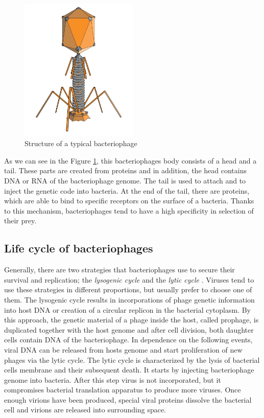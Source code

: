 \begin{figure}[h]
\includegraphics[width=0.5\textwidth]{./images/phage.png}
\centering
\caption{Structure of a typical bacteriophage
}
\label{fig:phage}
\end{figure}


As we can see in the Figure \ref{fig:phage}, this bacteriophages body consists of a head and a tail.
These parts are created from proteins and in addition, the head contains DNA or RNA of the bacteriophage genome.
The tail is used to attach and to inject the genetic code into bacteria.
At the end of the tail, there are proteins, which are able to bind to specific receptors on the surface of a bacteria.
Thanks to this mechanism, bacteriophages tend to have a high specificity in selection of their prey.

\subsection{Life cycle of bacteriophages}
Generally, there are two strategies that bacteriophages use to secure their survival and replication; the \emph{lysogenic cycle} and the \emph{lytic cycle} \cite{}.
Viruses tend to use these strategies in different proportions, but usually prefer to choose one of them.
The lysogenic cycle results in incorporations of phage genetic information into host DNA or creation of a circular replicon in the bacterial cytoplasm.
By this approach, the genetic material of a phage inside the host, called prophage, is duplicated together with the host genome and after cell division, both daughter cells contain DNA of the bacteriophage.
In dependence on the following events, viral DNA can be released from hosts genome and start proliferation of new phages via the lytic cycle.
The lytic cycle is characterized by the lysis of bacterial cells membrane and their subsequent death.
It starts by injecting bacteriophage genome into bacteria.
After this step virus is not incorporated, but it compromises bacterial translation apparatus to produce more viruses.
Once enough virions have been produced, special viral proteins dissolve the bacterial cell and virions are released into surrounding space.

